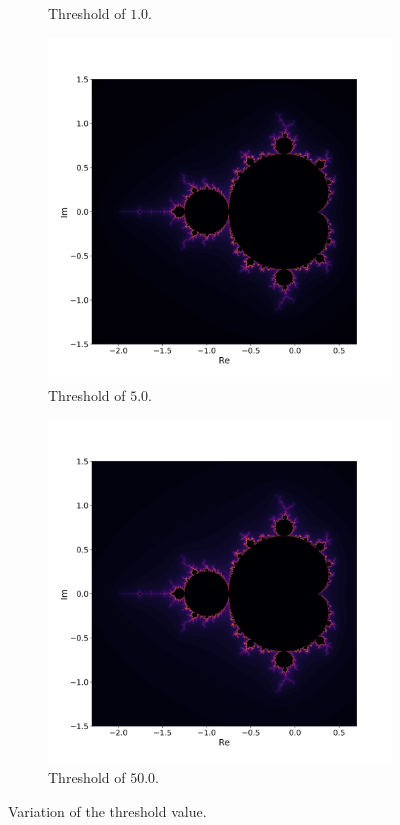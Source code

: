 \documentclass[
  12pt,					%
  a4paper,				%
  twoside,				%
]{report}
\begin{document}
\begin{figure}[H]
\begin{subfigure}{.45\textwidth}
  \caption{Threshold of $1.0$.}
\end{subfigure}
\begin{subfigure}{.45\textwidth}
  \centering
  \includegraphics[width=\linewidth]{IMG/Thresh5.png}
  \caption{Threshold of $5.0$.}
\end{subfigure}
\begin{subfigure}{.45\textwidth}
  \centering
  \includegraphics[width=\linewidth]{IMG/Thresh50.png}
  \caption{Threshold of $50.0$.}
\end{subfigure}
\caption{Variation of the threshold value.}
\label{FIG_Threshold}
\end{figure}
\end{document}
